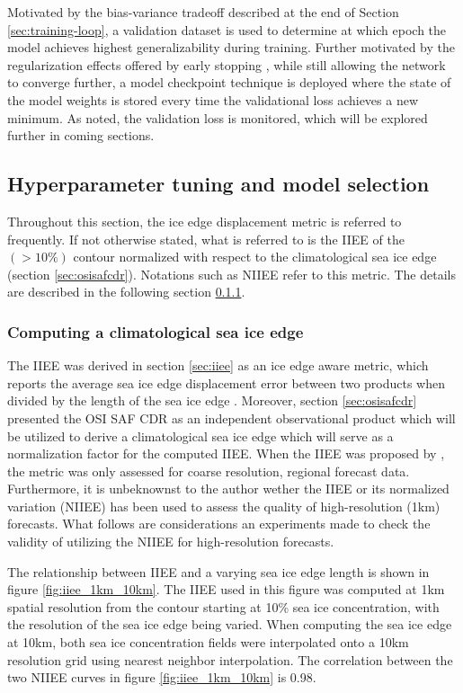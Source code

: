\documentclass[../main/thesis]{subfiles}
\begin{document}
Motivated by the bias-variance tradeoff described at the end of Section \ref{sec:training-loop}, a validation dataset is used to determine at which epoch the model achieves highest generalizability during training. Further motivated by the regularization effects offered by early stopping \citep{Graves2013}, while still allowing the network to converge further, a model checkpoint technique is deployed where the state of the model weights is stored every time the validational loss achieves a new minimum. As noted, the validation loss is monitored, which will be explored further in coming sections.


\subsection{Hyperparameter tuning and model selection}
\label{sec:model_development_results}
Throughout this section, the ice edge displacement metric is referred to frequently. If not otherwise stated, what is referred to is the IIEE of the $(> 10\%)$ contour normalized with respect to the climatological sea ice edge (section \ref{sec:osisafcdr}). Notations such as NIIEE refer to this metric. The details are described in the following section \ref{sec:clim_iceedge_compute}.

\subsubsection{Computing a climatological sea ice edge}
\label{sec:clim_iceedge_compute}
The IIEE \citep{Goessling2016} was derived in section \ref{sec:iiee} as an ice edge aware metric, which reports the average sea ice edge displacement error between two products when divided by the length of the sea ice edge \citep{Melsom2019}. Moreover, section \ref{sec:osisafcdr} presented the OSI SAF CDR as an independent observational product which will be utilized to derive a climatological sea ice edge which will serve as a normalization factor for the computed IIEE. When the IIEE was proposed by \citet{Goessling2016}, the metric was only assessed for coarse resolution, regional forecast data. Furthermore, it is unbeknownst to the author wether the IIEE or its normalized variation (NIIEE) has been used to assess the quality of high-resolution (1km) forecasts. What follows are considerations an experiments made to check the validity of utilizing the NIIEE for high-resolution forecasts.

The relationship between IIEE and a varying sea ice edge length is shown in figure \ref{fig:iiee_1km_10km}. The IIEE used in this figure was computed at 1km spatial resolution from the contour starting at 10\% sea ice concentration, with the resolution of the sea ice edge being varied. When computing the sea ice edge at 10km, both sea ice concentration fields were interpolated onto a 10km resolution grid using nearest neighbor interpolation. The correlation between the two NIIEE curves in figure \ref{fig:iiee_1km_10km} is 0.98.
\end{document}
